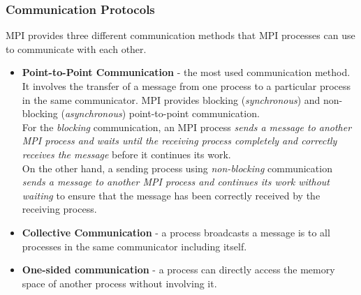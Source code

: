 \documentclass[11pt,a4paper]{article}
\begin{document}
	\subsubsection{Communication Protocols}
	MPI provides three different communication methods that MPI processes can use to communicate with each other.
	
	\begin{itemize}
		\item \textbf{Point-to-Point Communication} - the most used communication method. It involves the transfer of a message from one process to a particular process in the same communicator. MPI provides blocking (\textit{synchronous}) and non-blocking (\textit{asynchronous}) point-to-point communication. 
		\\For the \textit{blocking} communication, an MPI process \textit{sends a message to another MPI process and waits until the receiving process completely and correctly receives the message} before it continues its work. 
		\\On the other hand, a sending process using \textit{non-blocking} communication \textit{sends a message to another MPI process and continues its work without waiting} to ensure that the message has been correctly received by the receiving process.
		
		\item \textbf{Collective Communication} - a process broadcasts a message is to all processes in the same communicator including itself.
		
		\item \textbf{One-sided communication} - a process can directly access the memory space of another process without involving it.
	\end{itemize}
	
\end{document}
